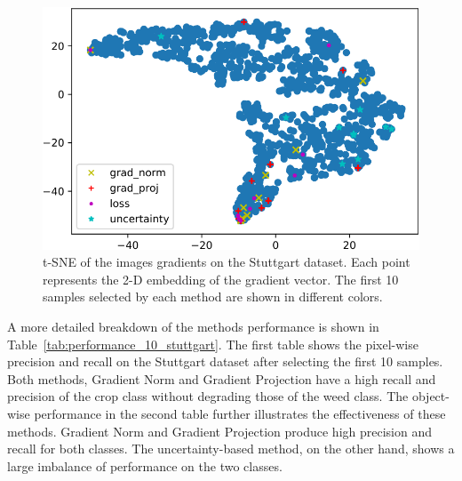 \documentclass[letterpaper, 10 pt, conference]{ieeeconf}  %
\begin{document}
    
    
 \begin{figure}
    \centering
    \includegraphics[width=0.95\linewidth]{pics/tsne_all-crop.pdf}
   		\caption{t-SNE of the images gradients on the Stuttgart dataset. Each point represents the 2-D embedding of the gradient vector. The first 10 samples selected by each method are shown in different colors.}
		\label{fig:tsne}    		
   \end{figure}
    
A more detailed breakdown of the methods performance is shown in Table~\ref{tab:performance_10_stuttgart}. The first table shows the pixel-wise precision and recall on the Stuttgart dataset after selecting the first 10 samples. Both methods, Gradient Norm and Gradient Projection have a high recall and precision of the crop class without degrading those of the weed class. The object-wise performance in the second table further illustrates the effectiveness of these methods. Gradient Norm and Gradient Projection produce high precision and recall for both classes. The uncertainty-based method, on the other hand, shows a large imbalance of performance on the two classes.
   


\end{document}
